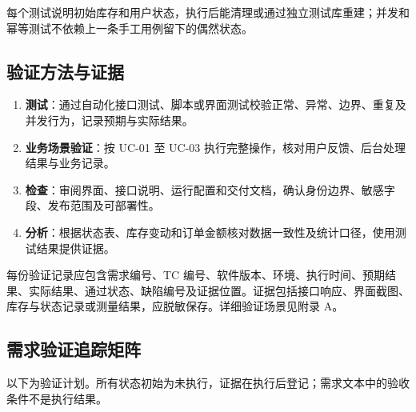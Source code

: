 每个测试说明初始库存和用户状态，执行后能清理或通过独立测试库重建；并发和幂等测试不依赖上一条手工用例留下的偶然状态。

\subsection{验证方法与证据}\label{sec:52-验证方法与证据}

\begin{enumerate}
\item {\bfseries 测试}：通过自动化接口测试、脚本或界面测试校验正常、异常、边界、重复及并发行为，记录预期与实际结果。
\item {\bfseries 业务场景验证}：按 UC-01 至 UC-03 执行完整操作，核对用户反馈、后台处理结果与业务记录。
\item {\bfseries 检查}：审阅界面、接口说明、运行配置和交付文档，确认身份边界、敏感字段、发布范围及可部署性。
\item {\bfseries 分析}：根据状态表、库存变动和订单金额核对数据一致性及统计口径，使用测试结果提供证据。
\end{enumerate}

每份验证记录应包含需求编号、TC 编号、软件版本、环境、执行时间、预期结果、实际结果、通过状态、缺陷编号及证据位置。证据包括接口响应、界面截图、库存与状态记录或测量结果，应脱敏保存。详细验证场景见附录 A。

\subsection{需求验证追踪矩阵}\label{sec:53-需求验证追踪矩阵}

以下为验证计划。所有状态初始为未执行，证据在执行后登记；需求文本中的验收条件不是执行结果。

